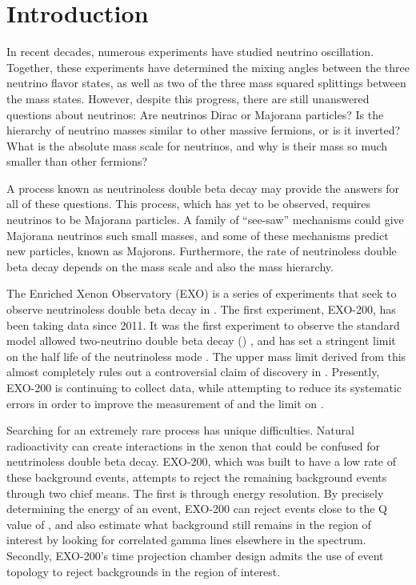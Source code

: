 \documentclass[herrin-thesis.tex]{subfiles}
\begin{document}
\chapter{Introduction}

In recent decades, numerous experiments have studied neutrino oscillation. Together, these experiments have determined the mixing angles between the three neutrino flavor states, as well as two of the three mass squared splittings between the mass states. However, despite this progress, there are still unanswered questions about neutrinos: Are neutrinos Dirac or Majorana particles? Is the hierarchy of neutrino masses similar to other massive fermions, or is it inverted? What is the absolute mass scale for neutrinos, and why is their mass so much smaller than other fermions?

A process known as neutrinoless double beta decay may provide the answers for all of these questions. This process, which has yet to be observed, requires neutrinos to be Majorana particles. A family of ``see-saw'' mechanisms could give Majorana neutrinos such small masses, and some of these mechanisms predict new particles, known as Majorons. Furthermore, the rate of neutrinoless double beta decay depends on the mass scale and also the mass hierarchy. 

The Enriched Xenon Observatory (EXO) is a series of experiments that seek to observe neutrinoless double beta decay in . The first experiment, EXO-200, has been taking data since 2011. It was the first experiment to observe the standard model allowed two-neutrino double beta decay (\twonu) \cite{Ackerman:2011gz}, and has set a stringent limit on the half life of the neutrinoless mode \cite{Auger:2012ar}. The upper mass limit derived from this almost completely rules out a controversial claim of discovery in  \cite{KlapdorKleingrothaus:2006ff}. Presently, EXO-200 is continuing to collect data, while attempting to reduce its systematic errors in order to improve the measurement of \twonu{} and the limit on \zeronu{}.

Searching for an extremely rare process has unique difficulties. Natural radioactivity can create interactions in the xenon that could be confused for neutrinoless double beta decay. EXO-200, which was built to have a low rate of these background events, attempts to reject the remaining background events through two chief means. The first is through energy resolution. By precisely determining the energy of an event, EXO-200 can reject events close to the Q value of , and also estimate what background still remains in the region of interest by looking for correlated gamma lines elsewhere in the spectrum. Secondly, EXO-200's time projection chamber design admits the use of event topology to reject backgrounds in the region of interest.
\end{document}
